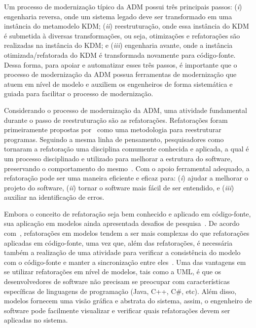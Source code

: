 Um processo de modernização típico da ADM possui três principais passos: (\textit{i}) engenharia reversa, onde um sistema legado deve ser transformado em uma instância do metamodelo KDM; (\textit{ii}) reestruturação, onde essa instância do KDM é submetida à diversas transformações, ou seja, otimizações e refatorações são realizadas na instância do KDM; e (\textit{iii}) engenharia avante, onde a instância otimizada/refatorada do KDM é transformada novamente para código-fonte. Dessa forma, para apoiar e automatizar esses três passos, é importante que o processo de modernização da ADM possua ferramentas de modernização que atuem em nível de modelo e auxiliem os engenheiros de forma sistemática e guiada para facilitar o processo de modernização.

Considerando o processo de modernização da ADM, uma atividade fundamental durante o passo de reestruturação são as refatorações. Refatorações foram primeiramente propostas por~ como uma metodologia para reestruturar programas. Seguindo a mesma linha de pensamento, pesquisadores como  tornaram a refatoração uma disciplina comumente conhecida e aplicada, a qual é um processo disciplinado e utilizado para melhorar a estrutura do software, preservando o comportamento do mesmo~\cite{Fowler1999}. Com o apoio ferramental adequado, a refatoração pode ser uma maneira eficiente e eficaz para: (\textit{i}) ajudar a melhorar o projeto do software, (\textit{ii}) tornar o software mais fácil de ser entendido, e (\textit{iii}) auxiliar na identificação de erros. %







Embora o conceito de refatoração seja bem conhecido e aplicado em código-fonte, sua aplicação em modelos ainda apresentada desafios de pesquisa~\cite{Gorp}. De acordo com~, refatorações em modelos tendem a ser mais complexas do que refatorações aplicadas em código-fonte, uma vez que, além das refatorações, é necessária também a realização de uma atividade para verificar a consistência do modelo com o código-fonte e manter a sincronização entre eles~\cite{KolahdouzRahimi20145}. Uma das vantagens em se utilizar refatorações em nível de modelos, tais como a UML, é que os desenvolvedores de software não precisam se preocupar com características específicas de linguagens de programação (Java, C++, C\#, etc). Além disso, modelos fornecem uma visão gráfica e abstrata do sistema, assim, o engenheiro de software pode facilmente visualizar e verificar quais refatorações devem ser aplicadas no sistema. 

